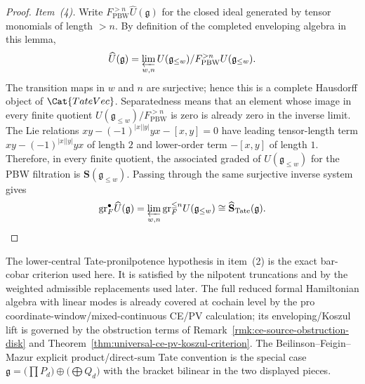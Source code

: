 \documentclass[11pt]{memoir}
\begin{document}
\begin{proof}
  \emph{Item~(4).} Write
  \(F^{>n}_{\mathrm{PBW}}\widehat U(\mathfrak g)\) for the closed ideal
  generated by tensor monomials of length \(>n\).  By definition of the
  completed enveloping algebra in this lemma,
  \[
    \widehat U(\mathfrak g)
    =
    \varprojlim_{w,n}
    U(\mathfrak g_{\leq w})/
    F^{>n}_{\mathrm{PBW}}U(\mathfrak g_{\leq w}) .
  \]
  The transition maps in \(w\) and \(n\) are surjective; hence this is a
  complete Hausdorff object of \(\Cat{TateVec}\).  Separatedness means
  that an element whose image in every finite quotient
  \(U(\mathfrak g_{\leq w})/F^{>n}_{\mathrm{PBW}}\) is zero is already
  zero in the inverse limit.  The Lie relations
  \(xy-(-1)^{|x||y|}yx-[x,y]=0\) have leading tensor-length term
  \(xy-(-1)^{|x||y|}yx\) of length \(2\) and lower-order term
  \(-[x,y]\) of length \(1\).  Therefore, in every finite quotient, the
  associated graded of \(U(\mathfrak g_{\leq w})\) for the PBW
  filtration is
  \(\mathbf S(\mathfrak g_{\leq w})\).  Passing through the same
  surjective inverse system gives
  \[
    \mathrm{gr}_F^\bullet\widehat U(\mathfrak g)
    =
    \varprojlim_{w,n}\mathrm{gr}_F^{\le n}U(\mathfrak g_{\leq w})
    \cong
    \widehat{\mathbf S}_{\mathrm{Tate}}(\mathfrak g).
  \]
\end{proof}

\begin{rmk}
  The lower-central Tate-pronilpotence hypothesis in item~(2) is the
  exact bar-cobar criterion used here. It is satisfied by the nilpotent
  truncations and by the weighted admissible replacements used later.  The full reduced formal
  Hamiltonian algebra with linear modes is already covered at cochain
	  level by the pro coordinate-window/mixed-continuous CE/PV calculation; its
	  enveloping/Koszul
	  lift is governed by the obstruction terms of
  Remark~\ref{rmk:ce-source-obstruction-disk} and
  Theorem~\ref{thm:universal-ce-pv-koszul-criterion}. The
  Beilinson--Feigin--Mazur explicit product/direct-sum Tate convention
  \cite{beilinson-feigin-mazur} is the special case
  $\mathfrak g=\bigl(\prod P_d\bigr)\oplus\bigl(\bigoplus Q_d\bigr)$
  with the bracket bilinear in the two displayed pieces.
\end{rmk}
\end{document}
